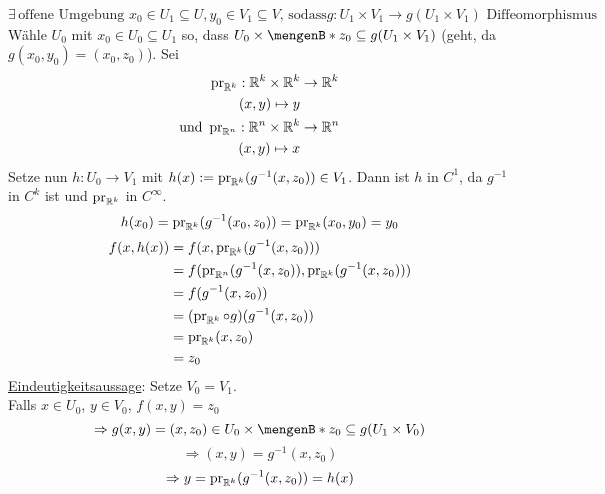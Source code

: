 \[
	\exists\, \text{offene Umgebung }x_0 \in U_1 \subseteq U, y_0 \in V_1 \subseteq V \text{, sodass} g: U_1 \times V_1 \to g(U_1 \times V_1) \text{ Diffeomorphismus}
\]
Wähle $U_0$ mit $x_0 \in U_0 \subseteq U_1$ so, dass $U_0 \times \set[z_0]{} \subseteq g(U_1 \times V_1)$ (geht, da $g(x_0,y_0)=(x_0,z_0)$).
Sei \begin{align*}
	\operatorname{pr}_{\mathbb{R}^k}: \mathbb{R}^k \times \mathbb{R}^k &\to \mathbb{R}^k \\
	(x,y) \mapsto y \\
	\text{und } \operatorname{pr}_{\mathbb{R}^n}: \mathbb{R}^n \times \mathbb{R}^k &\to \mathbb{R}^n \\
	(x,y) \mapsto x
\end{align*}  
Setze nun $h:U_0 \to V_1$ mit $h(x):= \operatorname{pr}_{\mathbb{R}^k}(g^{-1}(x,z_0)) \in V_1$. Dann ist $h$ in $C^1$, da $g^{-1}$ in $C^k$ ist und $\operatorname{pr}_{\mathbb{R}^k}$ in $C^{\infty}$. \\
\[
	h(x_0)= \operatorname{pr}_{\mathbb{R}^k}(g^{-1}(x_0,z_0)) = \operatorname{pr}_{\mathbb{R}^k}(x_0,y_0)=y_0
\]
\begin{align*}
	f(x,h(x)) &= f(x, \operatorname{pr}_{\mathbb{R}^k}(g^{-1}(x,z_0))) \\
	&= f(\operatorname{pr}_{\mathbb{R}^n}(g^{-1}(x,z_0)),\operatorname{pr}_{\mathbb{R}^k}(g^{-1}(x,z_0))) \\
	&= f(g^{-1}(x,z_0)) \\
	&= (\operatorname{pr}_{\mathbb{R}^k} \circ g)(g^{-1}(x,z_0)) \\
	&= \operatorname{pr}_{\mathbb{R}^k}(x,z_0) \\
	&= z_0
\end{align*}
\underline{Eindeutigkeitsaussage}:
Setze $V_0=V_1$. \\
Falls $x \in U_0$, $y \in V_0$, $f(x,y)=z_0$
\[
	\Rightarrow g(x,y)= (x,z_0) \in U_0 \times \set[z_0]{} \subseteq g(U_1 \times V_0)
\]
\[
	\Rightarrow (x,y)= g^{-1}(x,z_0)
\]
\[
	\Rightarrow y = \operatorname{pr}_{\mathbb{R}^k}(g^{-1}(x,z_0))=h(x)
\] \bewende
